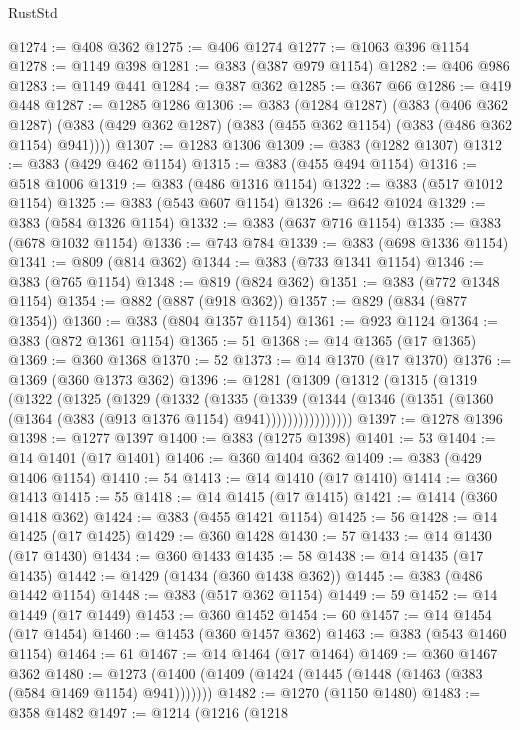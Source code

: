 \begin{lexlean}{RustStd}
\begin{coremodule}
{\begin{coremodule}
{{{{{{{{{{{{{{{{@1274 := @408 @362
@1275 := @406 @1274
@1277 := @1063 @396 @1154
@1278 := @1149 @398
@1281 := @383 (@387 @979 @1154)
@1282 := @406 @986
@1283 := @1149 @441
@1284 := @387 @362
@1285 := @367 @66
@1286 := @419 @448
@1287 := @1285 @1286
@1306 := @383
    (@1284 @1287)
    (@383
      (@406 @362 @1287)
      (@383 (@429 @362 @1287) (@383 (@455 @362 @1154) (@383 (@486 @362 @1154) @941))))
@1307 := @1283 @1306
@1309 := @383 (@1282 @1307)
@1312 := @383 (@429 @462 @1154)
@1315 := @383 (@455 @494 @1154)
@1316 := @518 @1006
@1319 := @383 (@486 @1316 @1154)
@1322 := @383 (@517 @1012 @1154)
@1325 := @383 (@543 @607 @1154)
@1326 := @642 @1024
@1329 := @383 (@584 @1326 @1154)
@1332 := @383 (@637 @716 @1154)
@1335 := @383 (@678 @1032 @1154)
@1336 := @743 @784
@1339 := @383 (@698 @1336 @1154)
@1341 := @809 (@814 @362)
@1344 := @383 (@733 @1341 @1154)
@1346 := @383 (@765 @1154)
@1348 := @819 (@824 @362)
@1351 := @383 (@772 @1348 @1154)
@1354 := @882 (@887 (@918 @362))
@1357 := @829 (@834 (@877 @1354))
@1360 := @383 (@804 @1357 @1154)
@1361 := @923 @1124
@1364 := @383 (@872 @1361 @1154)
@1365 := 51
@1368 := @14 @1365 (@17 @1365)
@1369 := @360 @1368
@1370 := 52
@1373 := @14 @1370 (@17 @1370)
@1376 := @1369 (@360 @1373 @362)
@1396 := @1281
    (@1309
      (@1312
        (@1315
          (@1319
            (@1322
              (@1325
                (@1329
                  (@1332
                    (@1335
                      (@1339
                        (@1344
                          (@1346 (@1351 (@1360 (@1364 (@383 (@913 @1376 @1154) @941))))))))))))))))
@1397 := @1278 @1396
@1398 := @1277 @1397
@1400 := @383 (@1275 @1398)
@1401 := 53
@1404 := @14 @1401 (@17 @1401)
@1406 := @360 @1404 @362
@1409 := @383 (@429 @1406 @1154)
@1410 := 54
@1413 := @14 @1410 (@17 @1410)
@1414 := @360 @1413
@1415 := 55
@1418 := @14 @1415 (@17 @1415)
@1421 := @1414 (@360 @1418 @362)
@1424 := @383 (@455 @1421 @1154)
@1425 := 56
@1428 := @14 @1425 (@17 @1425)
@1429 := @360 @1428
@1430 := 57
@1433 := @14 @1430 (@17 @1430)
@1434 := @360 @1433
@1435 := 58
@1438 := @14 @1435 (@17 @1435)
@1442 := @1429 (@1434 (@360 @1438 @362))
@1445 := @383 (@486 @1442 @1154)
@1448 := @383 (@517 @362 @1154)
@1449 := 59
@1452 := @14 @1449 (@17 @1449)
@1453 := @360 @1452
@1454 := 60
@1457 := @14 @1454 (@17 @1454)
@1460 := @1453 (@360 @1457 @362)
@1463 := @383 (@543 @1460 @1154)
@1464 := 61
@1467 := @14 @1464 (@17 @1464)
@1469 := @360 @1467 @362
@1480 := @1273 (@1400 (@1409 (@1424 (@1445 (@1448 (@1463 (@383 (@584 @1469 @1154) @941)))))))
@1482 := @1270 (@1150 @1480)
@1483 := @358 @1482
@1497 := @1214
    (@1216
      (@1218
}}}}}}}}}}}}}}}}
\end{coremodule}}
\end{coremodule}
\end{lexlean}
